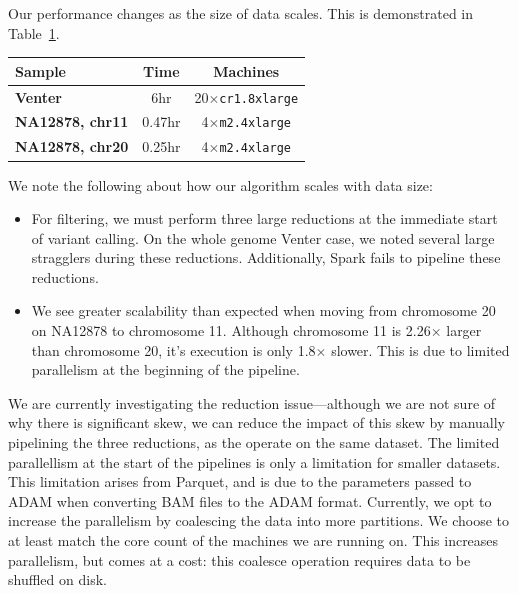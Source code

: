 \documentclass{acm_proc_article-sp}
\begin{document}
Our performance changes as the size of data scales. This is demonstrated in Table~\ref{tab:scaling}.

\begin{table}[h]
\begin{center}
\begin{tabular}{| l || c | c |}
\hline
\bf Sample & \bf Time & \bf Machines \\
\hline
\hline
\bf Venter & 6hr & 20$\times$\texttt{cr1.8xlarge} \\
\bf NA12878, chr11 & 0.47hr & 4$\times$\texttt{m2.4xlarge} \\
\bf NA12878, chr20 & 0.25hr & 4$\times$\texttt{m2.4xlarge} \\
\hline
\end{tabular}
\end{center}
\label{tab:scaling}
\end{table}

We note the following about how our algorithm scales with data size:

\begin{itemize}
\item For filtering, we must perform three large reductions at the immediate start of variant calling. On the whole genome Venter case,
we noted several large stragglers during these reductions. Additionally, Spark fails to pipeline these reductions.
\item We see greater scalability than expected when moving from chromosome 20 on NA12878 to chromosome 11. Although
chromosome 11 is 2.26$\times$ larger than chromosome 20, it's execution is only 1.8$\times$ slower. This is due to limited parallelism
at the beginning of the pipeline.
\end{itemize}

We are currently investigating the reduction issue---although we are not sure of why there is significant skew, we can reduce the impact
of this skew by manually pipelining the three reductions, as the operate on the same dataset. The limited parallellism at the start of
the pipelines is only a limitation for smaller datasets. This limitation arises from Parquet, and is due to the parameters passed to
ADAM when converting BAM files to the ADAM format. Currently, we opt to increase the parallelism by coalescing the data into
more partitions. We choose to at least match the core count of the machines we are running on. This increases parallelism, but comes
at a cost: this coalesce operation requires data to be shuffled on disk.
\end{document}
